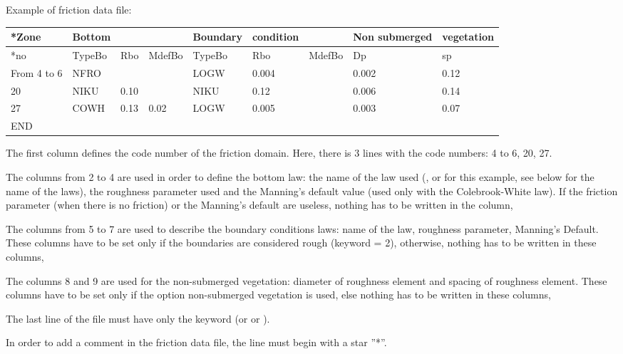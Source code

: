   Example of friction data file:



\begin{tabular}{|p{0.4in}|p{0.5in}|p{0.3in}|p{0.4in}|p{0.6in}|p{0.5in}|p{0.5in}|p{0.7in}|p{0.6in}|} \hline
*Zone & Bottom &  &  & Boundary & condition &  & Non submerged & vegetation \\ \hline
*no & TypeBo & Rbo & MdefBo & TypeBo & Rbo & MdefBo & Dp & sp \\ \hline
From 4 to 6 & NFRO &  &  & LOGW & 0.004 &  & 0.002 & 0.12 \\ \hline
20 & NIKU & 0.10 &  & NIKU & 0.12 &  & 0.006 & 0.14 \\ \hline
27 & COWH & 0.13 & 0.02 & LOGW & 0.005 &  & 0.003 & 0.07 \\ \hline
END &  &  &  &  &  &  &  &  \\ \hline
\end{tabular}



 The first column defines the code number of the friction domain. Here, there is 3 lines with the code numbers: 4 to 6, 20, 27.

 The columns from 2 to 4 are used in order to define the bottom law: the name of the law used (,  or  for this example, see below for the name of the laws), the roughness parameter used and the Manning's default value (used only with the Colebrook-White law). If the friction parameter (when there is no friction) or the Manning's default are useless, nothing has to be written in the column,

 The columns from 5 to 7 are used to describe the boundary conditions laws: name of the law, roughness parameter, Manning's Default. These columns have to be set only if the boundaries are considered rough (keyword  = 2), otherwise, nothing has to be written in these columns,

 The columns 8 and 9 are used for the non-submerged vegetation: diameter of roughness element and spacing of roughness element. These columns have to be set only if the option non-submerged vegetation is used, else nothing has to be written in these columns,

 The last line of the file must have only the keyword  (or  or ).

 In order to add a comment in the friction data file, the line must begin with a star ''*''.

